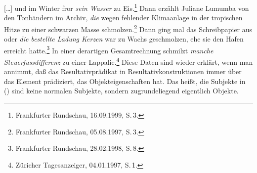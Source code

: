 \eal
\label{ex-unaccusative-result-zu-pp}
\ex\label{ex-fror-zu-eis} %
{}[\ldots] und im Winter fror \emph{sein Wasser} zu Eis.\footnote{
        Frankfurter Rundschau, 16.09.1999, S.\,3.%
}
\ex  
Dann erzählt Juliane Lumumba von den Tonbändern im Archiv, \emph{die} wegen fehlender Klimaanlage in der tropischen Hitze
     zu einer schwarzen Masse schmolzen.\footnote{
         Frankfurter Rundschau, 05.08.1997, S.\,3.%
}
\ex 
Dann ging mal das Schreibpapier aus oder \emph{die bestellte Ladung Kerzen} war zu Wachs geschmolzen, 
     ehe sie den Hafen erreicht hatte.\footnote{
Frankfurter Rundschau, 28.02.1998, S.\,8.%
}
\ex 
In einer derartigen Gesamtrechnung schmilzt \emph{manche Steuerfussdifferenz} zu einer Lappalie.\footnote{
Züricher Tagesanzeiger, 04.01.1997, S.\,1.%
}
\zl
Diese Daten sind wieder erklärt, wenn man annimmt, daß das Resultativprädikat
in Resultativkonstruktionen immer über das Element prädiziert, das Objekteigenschaften
hat. Das heißt, die Subjekte in () sind keine normalen Subjekte, sondern
zugrundeliegend eigentlich Objekte.

